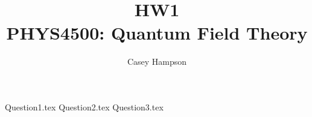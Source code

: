 \documentclass[titlepage]{article}
\title{HW1 \\[5pt] PHYS4500: Quantum Field Theory}
\author{Casey Hampson}
\begin{document}
    \maketitle
    \pagebreak

    {Question1.tex}
    {Question2.tex}
    {Question3.tex}
\end{document}
